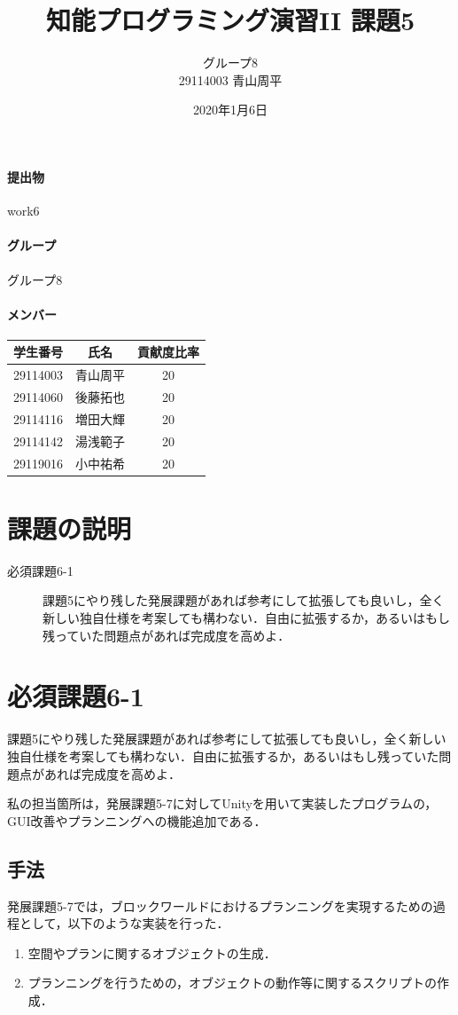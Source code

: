 \documentclass[12pt]{jarticle}
\title{知能プログラミング演習II 課題5}
\author{グループ8\\
  29114003 青山周平\\
}
\date{2020年1月6日}
\begin{document}
\maketitle

\paragraph{提出物} work6
\paragraph{グループ} グループ8
\paragraph{メンバー}
\begin{tabular}{|c|c|c|}
  \hline
  学生番号&氏名&貢献度比率\\
  \hline\hline
  29114003&青山周平&20\\
  \hline
  29114060&後藤拓也&20\\
  \hline
  29114116&増田大輝&20\\
  \hline
  29114142&湯浅範子&20\\
  \hline
  29119016&小中祐希&20\\
  \hline
\end{tabular}

\section{課題の説明}
\begin{description}
\item[必須課題6-1] 課題5にやり残した発展課題があれば参考にして拡張しても良いし，全く新しい独自仕様を考案しても構わない．自由に拡張するか，あるいはもし残っていた問題点があれば完成度を高めよ．
\end{description}

\section{必須課題6-1}
\begin{screen}
課題5にやり残した発展課題があれば参考にして拡張しても良いし，全く新しい独自仕様を考案しても構わない．自由に拡張するか，あるいはもし残っていた問題点があれば完成度を高めよ．
\end{screen}
私の担当箇所は，発展課題5-7に対してUnityを用いて実装したプログラムの，GUI改善やプランニングへの機能追加である．

\subsection{手法}
発展課題5-7では，ブロックワールドにおけるプランニングを実現するための過程として，以下のような実装を行った．
\begin{enumerate}
\item 空間やプランに関するオブジェクトの生成．
\item プランニングを行うための，オブジェクトの動作等に関するスクリプトの作成．
\end{enumerate}
\end{document}
